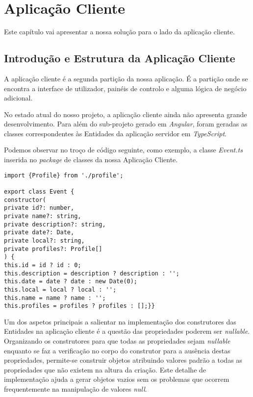 \chapter{Aplicação Cliente} \label{cliente}

Este capítulo vai apresentar a nossa solução para o lado da aplicação cliente.

\section{Introdução e Estrutura da Aplicação Cliente} \label{sec41}
A aplicação cliente é a segunda partição da nossa aplicação. É a partição onde se encontra a interface de utilizador, painéis de controlo e alguma lógica de negócio adicional.

No estado atual do nosso projeto, a aplicação cliente ainda não apresenta grande desenvolvimento. Para além do sub-projeto gerado em \emph{Angular}, foram geradas as classes correspondentes às Entidades da aplicação servidor em \emph{TypeScript}.

Podemos observar no troço de código seguinte, como exemplo, a classe \emph{Event.ts} inserida no \emph{package} de classes da nossa Aplicação Cliente.

\begin{verbatim}
import {Profile} from './profile';

export class Event {
constructor(
private id?: number,
private name?: string,
private description?: string,
private date?: Date,
private local?: string,
private profiles?: Profile[]
) {
this.id = id ? id : 0;
this.description = description ? description : '';
this.date = date ? date : new Date(0);
this.local = local ? local : '';
this.name = name ? name : '';
this.profiles = profiles ? profiles : [];}}
\end{verbatim}

Um dos aspetos principais a salientar na implementação dos construtores das Entidades na aplicação cliente é a questão das propriedades poderem ser \emph{nullable}. Organizando os construtores para que todas as propriedades sejam \emph{nullable} enquanto se faz a verificação no corpo do construtor para a ausência destas propriedades, permite-se construir objetos atribuindo valores padrão a todas as propriedades que não existem na altura da criação. Este detalhe de implementação ajuda a gerar objetos vazios sem os problemas que ocorrem frequentemente na manipulação de valores \emph{null}.